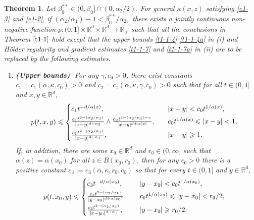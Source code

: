 \documentclass[a4paper,11pt]{amsart}
\renewcommand{\le}{\leqslant}
\renewcommand{\ge}{\geqslant}
\newcommand{\R}{\mathds R}
\newcommand{\B}{\beta}
\newcommand{\K}{\kappa}
\newcommand{\A}{\alpha}
\newcommand{\G}{\gamma}
\newtheorem{theorem}{Theorem}[section]
\theoremstyle{definition}
\begin{document}
\begin{theorem}\label{t1-2} Let $\B_0^{**}\in(0,\B_0]\cap(0,{\alpha_2}/{2}).$
For general $\K (x, z)$  satisfying  \eqref{e1-3} and \eqref{e1-2}, if
$
 ({\A_2}/{\A_1})-1<\B_0^{**}/{\A_2},
$
 there exists a
jointly continuous non-negative function
$p:(0,1]\times \R^d \times \R^d \rightarrow \R_+$ such that
all the conclusions in Theorem $\ref{t1-1}$ hold
except that the  upper bounds \eqref{t1-1-4}-\eqref{t1-1-4a} in {\rm (i)} and
H\"{o}lder regularity and gradient estimates \eqref{t1-1-7} and \eqref{t1-1-7a}
in {\rm (ii)} are to be replaced
by the following estimates.
\begin{enumerate}
\item[(i)]{\bf (Upper bounds)}\,\, For any $\gamma, c_0>0$, there exist constants $c_1 =c_1(\A,\K,c_0)>0$ and $c_2 =c_1(\A,\K,\G,c_0)>0$
such that for all $t\in (0,1]$ and $x,y\in\R^d$,
\begin{equation}\label{t1-1-9}
p(t,x,y)\le
\begin{cases}
{c_1}{t^{-{d/\A(x)}}},&\quad |x-y|< c_0t^{{1/\A(x)}}, \smallskip \\
\frac{c_1t^{2-({\A_2}/{\A_1})}}{|x-y|^{d+\A_2}} \wedge \frac{c_2t^{2-({\A_2}/{\A_1})-\gamma}}{|x-y|^{d+\A(x)}},&\quad
c_0t^{{1/\A(x)}}\le |x-y|< 1,  \smallskip \\
\frac{c_1t^{2-({\A_2}/{\A_1})}}{|x-y|^{d+\A_1}},&\quad |x-y|\ge 1.
\end{cases}
\end{equation}
If, in addition,  there are some $x_0\in\R^d$ and $r_0\in(0,\infty]$ such that $\alpha(z)=\alpha(x_0)$ for all $z \in B(x_0,r_0)$, then for any $c_0>0$ there is a positive
constant $c_3:=c_3(\A,\K,r_0,c_0)$ so that for every $t\in (0,1]$ and $y \in \R^d$,
\begin{equation}\label{t1-1-9a}
p(t,x_0,y)\le
\begin{cases}
{c_3}{t^{-{d/\A (x_0)}}},&\quad |y-x_0|< c_0t^{{1/\A(x_0)}}, \smallskip \\
\frac{c_3 t^{2-({\A_2}/{\A_1})}
}{|y-x_0|^{d+\A(x_0)}},& \quad
c_0t^{{1/\A(x_0)}}\le |y-x_0|< {r_0}/{2}, \smallskip \\
\frac{c_3 t^{2-({\A_2}/{\A_1})} }{|x-y_0|^{d+\A_1}},&\quad |y-x_0|\ge {r_0}/{2}.
\end{cases}
\end{equation}



\end{enumerate}
\end{theorem}
\end{document}
